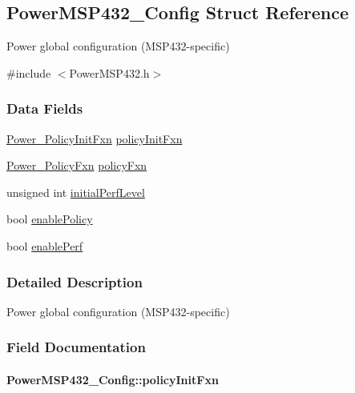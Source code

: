 \subsection{Power\+M\+S\+P432\+\_\+\+Config Struct Reference}
\label{struct_power_m_s_p432___config}


Power global configuration (M\+S\+P432-\/specific)  




{\ttfamily \#include $<$Power\+M\+S\+P432.\+h$>$}

\subsubsection*{Data Fields}
\begin{DoxyCompactItemize}
\item 
\hyperlink{_power_8h_a435fdeb71d13ea6be86f599c9b6a0d78}{Power\+\_\+\+Policy\+Init\+Fxn} \hyperlink{struct_power_m_s_p432___config_a7560437d45b1991b61ff57b997b09f9e}{policy\+Init\+Fxn}
\item 
\hyperlink{_power_8h_a333038d1e9cd5f93dda7b83f8a1afa8b}{Power\+\_\+\+Policy\+Fxn} \hyperlink{struct_power_m_s_p432___config_a1d97cab94fba9efb95b42d61ff333bae}{policy\+Fxn}
\item 
unsigned int \hyperlink{struct_power_m_s_p432___config_a45d076ae535718fb18260b12b1e625b7}{initial\+Perf\+Level}
\item 
bool \hyperlink{struct_power_m_s_p432___config_af3e984cb1b24646b510472362aef4d32}{enable\+Policy}
\item 
bool \hyperlink{struct_power_m_s_p432___config_aba4bb1729e7387514d47f7e6fb6fb09d}{enable\+Perf}
\end{DoxyCompactItemize}


\subsubsection{Detailed Description}
Power global configuration (M\+S\+P432-\/specific) 

\subsubsection{Field Documentation}
\paragraph[{policy\+Init\+Fxn}]{ Power\+M\+S\+P432\+\_\+\+Config\+::policy\+Init\+Fxn}\label{struct_power_m_s_p432___config_a7560437d45b1991b61ff57b997b09f9e}
